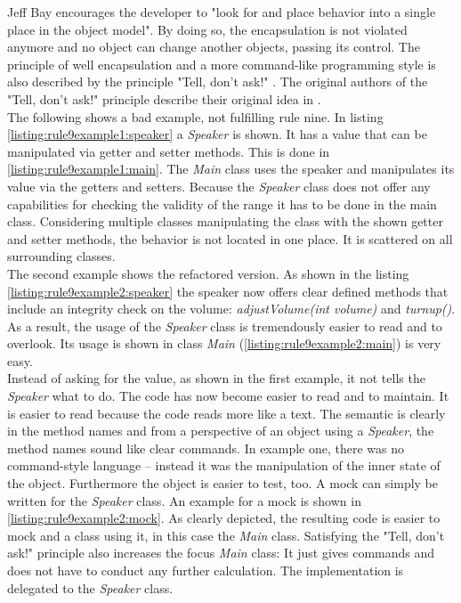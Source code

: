 Jeff Bay encourages the developer to "look for and place behavior into a single place in the object model". By doing so, the encapsulation is not violated anymore and no object can change another objects, passing its control. The principle of well encapsulation and a more command-like programming style is also described by the principle "Tell, don't ask!" \cite{telldontask}. The original authors of the "Tell, don't ask!" principle describe their original idea in \cite{telldontaskoriginal}.
\\

The following shows a bad example, not fulfilling rule nine. In listing \ref{listing:rule9example1:speaker} a \textit{Speaker} is shown. It has a value that can be manipulated via getter and setter methods. This is done in \ref{listing:rule9example1:main}. The \textit{Main} class uses the speaker and manipulates its value via the getters and setters. Because the \textit{Speaker} class does not offer any capabilities for checking the validity of the range it has to be done in the main class. Considering multiple classes manipulating the class with the shown getter and setter methods, the behavior is not located in one place. It is scattered on all surrounding classes. 
\\

The second example shows the refactored version. As shown in the listing \ref{listing:rule9example2:speaker} the speaker now offers clear defined methods that include an integrity check on the volume: \textit{adjustVolume(int volume)} and \textit{turnup()}. As a result, the usage of the \textit{Speaker} class is tremendously easier to read and to overlook. Its usage is shown in class \textit{Main} (\ref{listing:rule9example2:main}) is very easy. 
\\

Instead of asking for the value, as shown in the first example, it not tells the \textit{Speaker} what to do. The code has now become easier to read and to maintain. It is easier to read because the code reads more like a text. The semantic is clearly in the method names and from a perspective of an object using a \textit{Speaker}, the method names sound like clear commands. In example one, there was no command-style language -- instead it was the manipulation of the inner state of the object. Furthermore the object is easier to test, too. A mock can simply be written for the \textit{Speaker} class. An example for a mock is shown in \ref{listing:rule9example2:mock}. As clearly depicted, the resulting code is easier to mock and a class using it, in this case the \textit{Main} class. Satisfying the "Tell, don't ask!"\cite{telldontaskoriginal} principle also increases the focus \textit{Main} class: It just gives commands and does not have to conduct any further calculation. The implementation is delegated to the \textit{Speaker} class. 
\\

